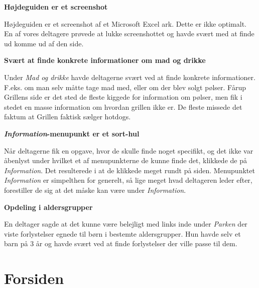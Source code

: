 \documentclass[10pt,a4paper]{article}      %
\newcommand\pic[1]{\texttt{[image: Pics/\#1]}}
\renewcommand\goodidea{\pic{goodidea}}
\renewcommand\smallproblem{\pic{smallproblem}}
\renewcommand\seriousproblem{\pic{seriousproblem}}
\begin{document}
\begin{kommentarer}
\item[\smallproblem]{\textbf{Højdeguiden er et screenshot}}

Højdeguiden er et screenshot af et Microsoft Excel ark. Dette er ikke optimalt.
En af vores deltagere prøvede at lukke screenshottet og havde svært med at finde
ud komme ud af den side.

\item[\smallproblem] \textbf{Svært at finde konkrete informationer om mad og drikke}

Under \emph{Mad og drikke} havde deltagerne svært ved at finde konkrete
informationer. F.eks. om man selv måtte tage mad med, eller om der blev solgt
pølser. Fårup Grillens side er det sted de fleste kiggede for information om
pølser, men fik i stedet en masse information om hvordan grillen ikke er. De
fleste missede det faktum at Grillen faktisk sælger hotdogs.

\item[\seriousproblem]{\textbf{\emph{Information}-menupunkt er et sort-hul}}

Når deltagerne fik en opgave, hvor de skulle finde noget specifikt, og det ikke
var åbenlyst under hvilket et af menupunkterne de kunne finde det, klikkede de
på \emph{Information}. Det resulterede i at de klikkede meget rundt på siden.
Menupunktet \emph{Information} er simpelthen for generelt, så lige meget hvad
deltageren leder efter, forestiller de sig at det måske kan være under
\emph{Information}.

\item[\goodidea] \textbf{Opdeling i aldersgrupper}

En deltager sagde at det kunne være belejligt med links inde under \emph{Parken} der viste
forlystelser egnede til børn i bestemte aldersgrupper. Hun havde selv et barn på 3 år og havde
svært ved at finde forlystelser der ville passe til dem.


\end{kommentarer}

\section{Forsiden}
\end{document}
